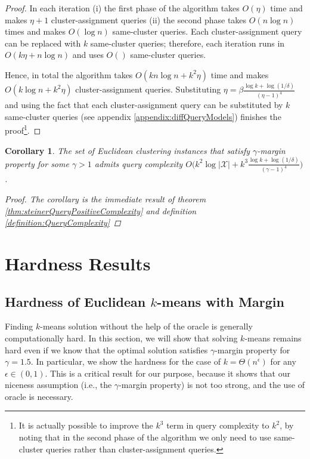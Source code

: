 \documentclass{article}
\newcommand{\mc}{\mathcal}
\newtheorem{corollary}[theorem]{Corollary}
\begin{document}
\begin{proof}
In each iteration (i) the first phase of the algorithm takes $O(\eta)$ time and makes $\eta+1$ cluster-assignment queries (ii) the second phase takes $O(n\log n)$ times and makes $O(\log n)$ same-cluster queries. Each cluster-assignment query can be replaced with $k$ same-cluster queries; therefore, each iteration runs in $O(k\eta + n\log n)$ and uses $O()$ same-cluster queries.

Hence, in total the algorithm takes $O(kn\log n + k^2\eta)$ time and makes $O(k\log n + k^2\eta)$ cluster-assignment queries. Substituting $\eta = \beta\frac{\log k + \log(1/\delta)}{(\eta-1)^4}$ and using the fact that each cluster-assignment query can be substituted by $k$ same-cluster queries (see appendix \ref{appendix:diffQueryModels}) finishes the proof\footnote{It is actually possible to improve the $k^3$ term in query complexity to $k^2$, by noting that in the second phase of the algorithm we only need to use same-cluster queries rather than cluster-assignment queries.}.
\end{proof}

\begin{corollary}
The set of Euclidean clustering instances that satisfy $\gamma$-margin property for some $\gamma > 1$ admits query complexity $O\big(k^2\log |\mc X| + k^3\frac{\log k + \log (1/\delta)}{(\gamma - 1)^4}\big)$. 
\begin{proof}
The corollary is the immediate result of theorem \ref{thm:steinerQueryPositiveComplexity} and definition \ref{definition:QueryComplexity}
\end{proof}

\end{corollary}

\section{Hardness Results}
\label{section:lowerBounds}

\subsection{Hardness of Euclidean $k$-means with Margin}

Finding $k$-means solution without the help of the oracle is generally computationally hard. In this section, we will show that solving $k$-means remains hard even if we know that the optimal solution satisfies $\gamma$-margin property for $\gamma=1.5$. In particular, we show the hardness for the case of $k=\Theta(n^\epsilon)$ for any $\epsilon\in (0,1)$. This is a critical result for our purpose, because it shows that our niceness assumption (i.e., the $\gamma$-margin property) is not too strong, and the use of oracle is necessary.
\end{document}
